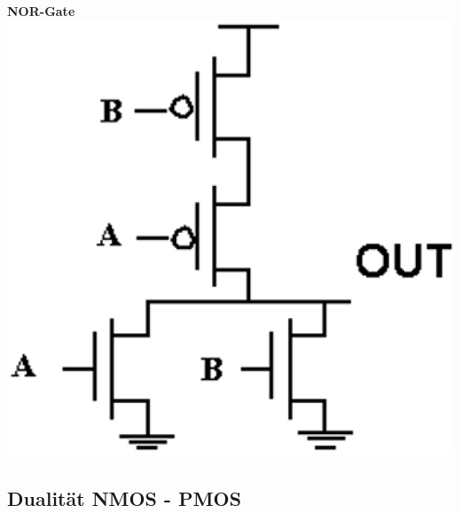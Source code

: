 \begin{minipage}[t]{0.38\columnwidth}
    \begin{center}
        \textbf{NOR-Gate} \\
    \includegraphics[width=\columnwidth]{images/cmos_nor.png}
    \end{center}
\end{minipage}


\subsection{Dualität NMOS - PMOS}